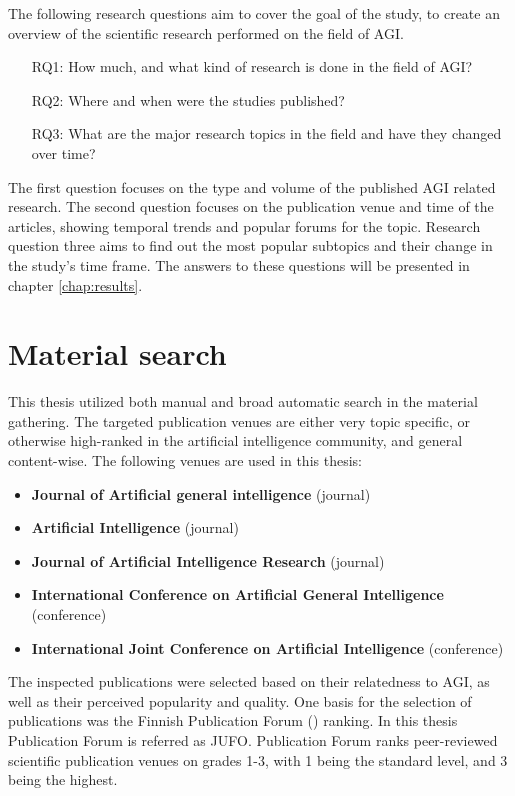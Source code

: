 \documentclass[utf8,english]{gradu3}
\begin{document}
The following research questions aim to cover the goal of the study, to create
an overview of the scientific research performed on the field of AGI.

\begin{itemize}
  \item[RQ1:] How much, and what kind of research is done in the field of AGI?
  \item[RQ2:] Where and when were the studies published?
  \item[RQ3:] What are the major research topics in the field and have they
        changed over time?
\end{itemize}

The first question focuses on the type and volume of the published AGI related
research. The second question focuses on the publication venue and time of the
articles, showing temporal trends and popular forums for the topic. Research
question three aims to find out the most popular subtopics and their change in
the study's time frame. The answers to these questions will be presented in
chapter \ref*{chap:results}.


\section{Material search}

This thesis utilized both manual and broad automatic search in the material
gathering. The targeted publication venues are either very topic specific, or
otherwise high-ranked in the artificial intelligence community, and general
content-wise. The following venues are used in this thesis:

\begin{itemize}
  \item \textbf{Journal of Artificial general intelligence} (journal)
  \item \textbf{Artificial Intelligence} (journal)
  \item \textbf{Journal of Artificial Intelligence Research} (journal)
  \item \textbf{International Conference on Artificial General Intelligence}
        (conference)
  \item \textbf{International Joint Conference on Artificial Intelligence}
        (conference)
\end{itemize}

The inspected publications were selected based on their relatedness to AGI, as
well as their perceived popularity and quality. One basis for the selection of
publications was the Finnish Publication Forum (\cite{jufo}) ranking. In this
thesis Publication Forum is referred as JUFO. Publication Forum ranks
peer-reviewed scientific publication venues on grades 1-3, with 1 being the
standard level, and 3 being the highest.
\end{document}

